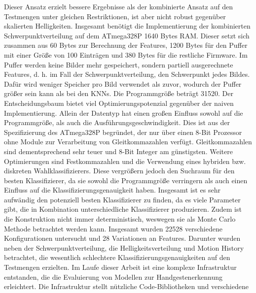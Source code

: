 Dieser Ansatz erzielt bessere Ergebnisse als der kombinierte Ansatz auf den Testmengen unter gleichen Restriktionen, ist aber nicht robust gegenüber skalierten Helligkeiten.
\newline
\newline
Insgesamt benötigt die Implementierung der kombinierten Schwerpunktverteilung auf dem ATmega328P 1640 Bytes RAM. Dieser setzt sich zusammen aus 60 Bytes zur Berechnung der Features, 1200 Bytes für den Puffer
mit einer Größe von 100 Einträgen
und 380 Bytes für die restliche Firmware. Im Puffer werden keine Bilder mehr gespeichert, sondern partiell ausgerechnete Features, d. h. im Fall der Schwerpunktverteilung, den Schwerpunkt jedes Bildes.
Dafür wird weniger Speicher pro Bild verwendet als zuvor, wodurch der Puffer größer sein kann als bei den KNNs. Die Programmgröße beträgt 31520.
\newline
\newline
Der Entscheidungsbaum bietet viel Optimierungspotenzial gegenüber der naiven Implementierung. Allein der Datentyp hat einen großen Einfluss sowohl auf die Programmgröße, als auch die Ausführungsgeschwindigkeit.
Dies ist aus der Spezifizierung des ATmega328P begründet, der nur über einen 8-Bit Prozessor ohne Module zur Verarbeitung von Gleitkommazahlen verfügt. Gleitkommazahlen sind dementsprechend sehr teuer und 8-Bit
Integer am günstigsten. Weitere Optimierungen sind Festkommazahlen und die Verwendung eines hybriden bzw. diskreten Wahlklassifizierers. Diese vergrößern jedoch den Suchraum für den besten Klassifizierer, da sie
sowohl die Programmgröße verringern als auch einen Einfluss auf die Klassifizierungsgenauigkeit haben.
\newline
\newline
Insgesamt ist es sehr aufwändig den potenziell besten Klassifizierer zu finden, da es viele Parameter gibt, die in Kombination unterschiedliche Klassifizierer produzieren. Zudem ist die
Konstruktion nicht immer deterministisch, weswegen sie als Monte Carlo Methode betrachtet werden kann. Insgesamt wurden 22528 verschiedene Konfigurationen untersucht und 28 Variationen an Features.
Darunter wurden neben der Schwerpunktverteilung, die Helligkeitsverteilung und Motion History betrachtet, die wesentlich schlechtere Klassifizierungsgenauigkeiten auf den Testmengen erzielten.
\newline
\newline
Im Laufe dieser Arbeit ist eine komplexe Infrastruktur entstanden, die die Evaluierung von Modellen zur Handgestenerkennung erleichtert. Die Infrastruktur stellt nützliche Code-Bibliotheken und verschiedene
